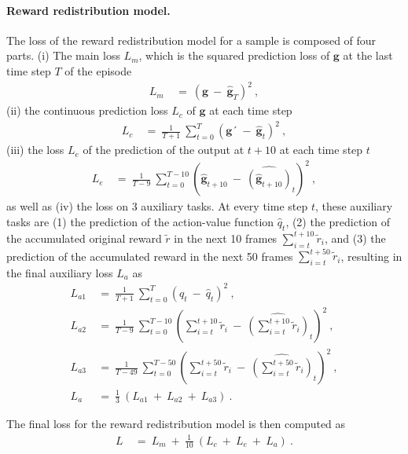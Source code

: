 \documentclass{article}
\newcommand{\returnrealization}{\mathbf{g}}
\begin{document}
\begin{appendices}
\paragraph{Reward redistribution model.}
The loss of the reward redistribution model for a sample is composed of four parts.
(i) The main loss $L_m$,
which is the squared prediction loss of $\returnrealization$ at the last time step $T$ of the episode
\begin{align}
    L_m \ &= \ \left(\returnrealization \ - \ \widehat{\returnrealization}_T\right)^2 \ ,
\end{align}
(ii) the continuous prediction loss $L_c$ of $\returnrealization$ at each time step
\begin{align}
    L_c \ &= \ \frac{1}{T+1} \ \sum_{t=0}^T\left(\returnrealization ´
    \ -  \ \widehat{\returnrealization}_t\right)^2\ ,
\end{align}
(iii) the loss $L_e$ of the prediction of the output at $t+10$ at each time step $t$
\begin{align}
    L_e \ &= \ \frac{1}{T-9} \ \sum_{t=0}^{T-10}\left(\widehat{\returnrealization}_{t+10}
    \ - \ \widehat{\left(\widehat{\returnrealization}_{t+10}\right)}_t\right)^2 \ ,
\end{align}
as well as (iv) the loss on 3 auxiliary tasks.
At every time step $t$,
these auxiliary tasks are
(1) the prediction of the action-value function $\widehat{q}_t$,
(2) the prediction of the accumulated original reward $\tilde{r}$ in the next 10 frames 
$\sum_{i=t}^{t+10} \tilde{r}_i$,
and (3) the prediction of the accumulated reward in the next 50 frames
$\sum_{i=t}^{t+50} \tilde{r}_i$,
resulting in the final auxiliary loss $L_a$ as
\begin{align}
    L_{a1} \ &= \ \frac{1}{T+1} \ \sum_{t=0}^T\left(q_t \ - \ \widehat{q}_t\right)^2 \ ,\\
    L_{a2} \ &= \ \frac{1}{T-9} \ \sum_{t=0}^{T-10}\left(\sum_{i=t}^{t+10} \tilde{r}_i 
    \ - \ \widehat{\left(\sum_{i=t}^{t+10} \tilde{r}_i\right)}_t\right)^2 \ ,\\
    L_{a3} \ &= \ \frac{1}{T-49} \ \sum_{t=0}^{T-50}\left(\sum_{i=t}^{t+50} \tilde{r}_i 
    \ - \ \widehat{\left(\sum_{i=t}^{t+50} \tilde{r}_i\right)}_t\right)^2\ ,\\
    L_a \ &= \ \frac{1}{3} \ \left(L_{a1} \ + \ L_{a2}\ +\ L_{a3}\right)\ .
\end{align}

The final loss for the reward redistribution model is then computed as
\begin{align}
    L \ &= \ L_m \ + \ \frac{1}{10} \ \left(L_c \ + \ L_e \ + \ L_a \right) \ .
\end{align}


\end{appendices}
\end{document}
